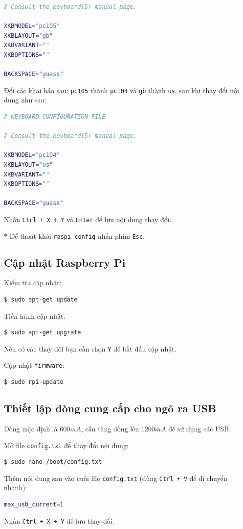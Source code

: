 \begin{list}{--}{}
\begin{lstlisting}[language=bash]
# Consult the keyboard(5) manual page.

XKBMODEL="pc105"
XKBLAYOUT="gb"
XKBVARIANT=""
XKBOPTIONS=""

BACKSPACE="guess"
\end{lstlisting}

Đổi các khai báo sau: \verb|pc105| thành \verb|pc104| và \verb|gb| thành \verb|us|, sau khi thay đổi nội dung như sau:
\begin{lstlisting}[language=bash]
# KEYBOARD CONFIGURATION FILE

# Consult the keyboard(5) manual page.

XKBMODEL="pc104"
XKBLAYOUT="us"
XKBVARIANT=""
XKBOPTIONS=""

BACKSPACE="guess"
\end{lstlisting}

Nhấn \verb|Ctrl + X + Y| và \verb|Enter| để lưu nội dung thay đổi.
\item[$\ast$] Để thoát khỏi \verb|raspi-config| nhấn phím \verb|Esc|.
\end{list}
\subsection{Cập nhật Raspberry Pi}
\begin{list}{--}{}
\item Kiểm tra cập nhật:
\begin{lstlisting}[language=bash]
$ sudo apt-get update
\end{lstlisting}
\item Tiến hành cập nhật:
\begin{lstlisting}[language=bash]
$ sudo apt-get upgrate
\end{lstlisting}
Nếu có các thay đổi bạn cần chọn \verb|Y| để bắt đầu cặp nhật.
\item Cập nhật \verb|firmware|:
\begin{lstlisting}[language=bash]
$ sudo rpi-update
\end{lstlisting}
\end{list}
\subsection{Thiết lập dòng cung cấp cho ngõ ra USB}
Dòng mặc định là $600mA$, cần tăng dòng lên $1200mA$ để sử dụng các USB.
\begin{list}{--}{}
\item Mở file \verb|config.txt| để thay đổi nội dung:
\begin{lstlisting}[language=bash]
$ sudo nano /boot/config.txt
\end{lstlisting}
\item Thêm nội dung sau vào cuối file \verb|config.txt| (dùng \verb|Ctrl + V| để di chuyển nhanh):
\begin{lstlisting}[language=bash]
max_usb_current=1
\end{lstlisting}
Nhấn \verb|Ctrl + X + Y| để lưu thay đổi.
\end{list}
